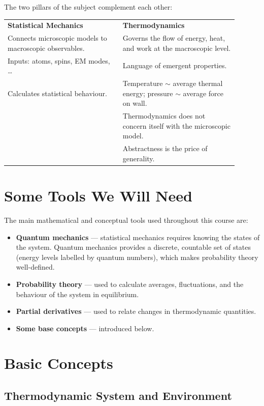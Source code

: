 The two pillars of the subject complement each other:

\begin{center}
\begin{tabular}{p{0.45\linewidth}|p{0.45\linewidth}}
  \textbf{Statistical Mechanics} & \textbf{Thermodynamics} \\[4pt]
  Connects microscopic models to macroscopic observables. & Governs the flow of energy, heat,
  and work at the macroscopic level. \\[4pt]
  Inputs: atoms, spins, EM modes, \ldots & Language of emergent properties. \\[4pt]
  Calculates statistical behaviour. & Temperature $\sim$ average thermal energy; pressure $\sim$
  average force on wall. \\[4pt]
  & Thermodynamics does not concern itself with the microscopic model. \\[4pt]
  & Abstractness is the price of generality.
\end{tabular}
\end{center}

\section{Some Tools We Will Need}

The main mathematical and conceptual tools used throughout this course are:
\begin{itemize}
  \item \textbf{Quantum mechanics} --- statistical mechanics requires knowing the states of the
        system. Quantum mechanics provides a discrete, countable set of states (energy levels
        labelled by quantum numbers), which makes probability theory well-defined.
  \item \textbf{Probability theory} --- used to calculate averages, fluctuations, and the
        behaviour of the system in equilibrium.
  \item \textbf{Partial derivatives} --- used to relate changes in thermodynamic quantities.
  \item \textbf{Some base concepts} --- introduced below.
\end{itemize}

\section{Basic Concepts}

\subsection{Thermodynamic System and Environment}

